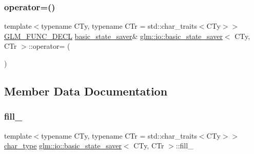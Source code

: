 \subsubsection{\texorpdfstring{operator=()}{operator=()}}
{\footnotesize\ttfamily template$<$typename C\+Ty, typename C\+Tr = std\+::char\+\_\+traits$<$\+C\+Ty$>$$>$ \\
\hyperlink{setup_8hpp_ab2d052de21a70539923e9bcbf6e83a51}{G\+L\+M\+\_\+\+F\+U\+N\+C\+\_\+\+D\+E\+CL} \hyperlink{classglm_1_1io_1_1basic__state__saver}{basic\+\_\+state\+\_\+saver}\& \hyperlink{classglm_1_1io_1_1basic__state__saver}{glm\+::io\+::basic\+\_\+state\+\_\+saver}$<$ C\+Ty, C\+Tr $>$\+::operator= (\begin{DoxyParamCaption}\item[{\hyperlink{classglm_1_1io_1_1basic__state__saver}{basic\+\_\+state\+\_\+saver}$<$ C\+Ty, C\+Tr $>$ const \&}]{ }\end{DoxyParamCaption})\hspace{0.3cm}{\ttfamily [private]}}



\subsection{Member Data Documentation}
\mbox{\label{classglm_1_1io_1_1basic__state__saver_abf8166290d087051954306facad38e00}} 
\subsubsection{\texorpdfstring{fill\+\_\+}{fill\_}}
{\footnotesize\ttfamily template$<$typename C\+Ty, typename C\+Tr = std\+::char\+\_\+traits$<$\+C\+Ty$>$$>$ \\
\hyperlink{classglm_1_1io_1_1basic__state__saver_ae6abb8e2e6bd4a044e953746691ffe8e}{char\+\_\+type} \hyperlink{classglm_1_1io_1_1basic__state__saver}{glm\+::io\+::basic\+\_\+state\+\_\+saver}$<$ C\+Ty, C\+Tr $>$\+::fill\+\_\+\hspace{0.3cm}{\ttfamily [private]}}

\mbox{\label{classglm_1_1io_1_1basic__state__saver_a2017c6e006a9e5c0c1ee191aee59c835}} 
